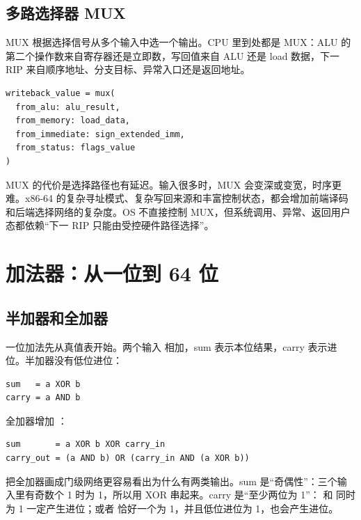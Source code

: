 \subsection{多路选择器 MUX}

MUX 根据选择信号从多个输入中选一个输出。CPU 里到处都是 MUX：ALU 的第二个操作数来自寄存器还是立即数，写回值来自 ALU 还是 load 数据，下一 RIP 来自顺序地址、分支目标、异常入口还是返回地址。

\begin{lstlisting}
writeback_value = mux(
  from_alu: alu_result,
  from_memory: load_data,
  from_immediate: sign_extended_imm,
  from_status: flags_value
)
\end{lstlisting}

MUX 的代价是选择路径也有延迟。输入很多时，MUX 会变深或变宽，时序更难。x86-64 的复杂寻址模式、复杂写回来源和丰富控制状态，都会增加前端译码和后端选择网络的复杂度。OS 不直接控制 MUX，但系统调用、异常、返回用户态都依赖“下一 RIP 只能由受控硬件路径选择”。

\section{加法器：从一位到 64 位}

\subsection{半加器和全加器}

一位加法先从真值表开始。两个输入  相加，sum 表示本位结果，carry 表示进位。半加器没有低位进位：

\begin{lstlisting}
sum   = a XOR b
carry = a AND b
\end{lstlisting}

全加器增加 ：

\begin{lstlisting}
sum       = a XOR b XOR carry_in
carry_out = (a AND b) OR (carry_in AND (a XOR b))
\end{lstlisting}

把全加器画成门级网络更容易看出为什么有两类输出。sum 是“奇偶性”：三个输入里有奇数个 1 时为 1，所以用 XOR 串起来。carry 是“至少两位为 1”： 和  同时为 1 一定产生进位；或者  恰好一个为 1，并且低位进位为 1，也会产生进位。

